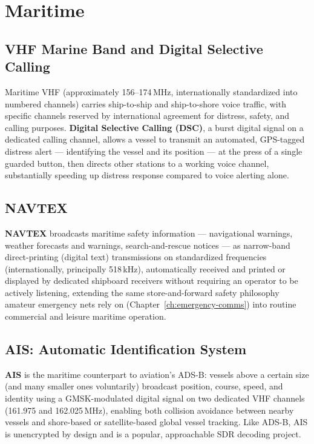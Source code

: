 \section{Maritime}

\subsection{VHF Marine Band and Digital Selective Calling}

Maritime VHF (approximately 156--174\,MHz, internationally standardized
into numbered channels) carries ship-to-ship and ship-to-shore voice
traffic, with specific channels reserved by international agreement for
distress, safety, and calling purposes. \textbf{Digital Selective
Calling (DSC)}, a burst digital signal on a dedicated calling channel,
allows a vessel to transmit an automated, GPS-tagged distress alert
--- identifying the vessel and its position --- at the press of a single
guarded button, then directs other stations to a working voice channel,
substantially speeding up distress response compared to voice alerting
alone.

\subsection{NAVTEX}

\textbf{NAVTEX} broadcasts maritime safety information --- navigational
warnings, weather forecasts and warnings, search-and-rescue
notices --- as narrow-band direct-printing (digital text) transmissions
on standardized frequencies (internationally, principally 518\,kHz),
automatically received and printed or displayed by dedicated shipboard
receivers without requiring an operator to be actively listening,
extending the same store-and-forward safety philosophy amateur emergency
nets rely on (Chapter~\ref{ch:emergency-comms}) into routine commercial
and leisure maritime operation.

\subsection{AIS: Automatic Identification System}

\textbf{AIS} is the maritime counterpart to aviation's ADS-B: vessels
above a certain size (and many smaller ones voluntarily) broadcast
position, course, speed, and identity using a GMSK-modulated digital
signal on two dedicated VHF channels (161.975 and 162.025\,MHz),
enabling both collision avoidance between nearby vessels and
shore-based or satellite-based global vessel tracking. Like ADS-B, AIS
is unencrypted by design and is a popular, approachable SDR decoding
project.

